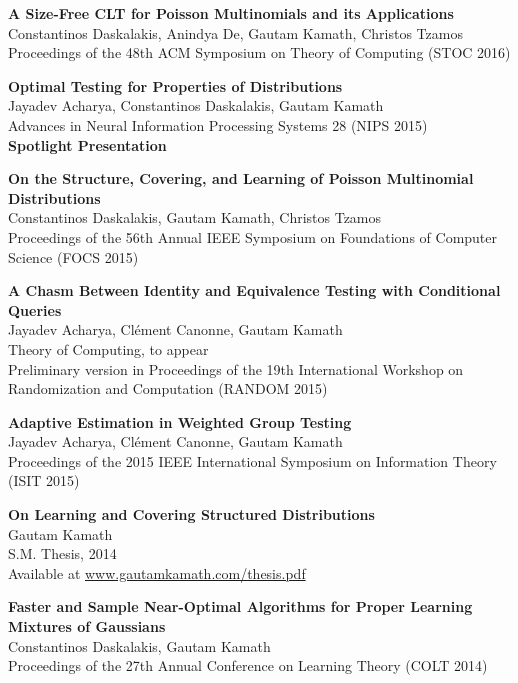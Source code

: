 \documentclass{res}
\begin{document}
\begin{resume}
      {\bf A Size-Free CLT for Poisson Multinomials and its Applications} \\
      Constantinos Daskalakis, Anindya De, Gautam Kamath, Christos Tzamos \\
      Proceedings of the 48th ACM Symposium on Theory of Computing (STOC 2016)
      
      {\bf Optimal Testing for Properties of Distributions} \\
      Jayadev Acharya, Constantinos Daskalakis, Gautam Kamath \\
      Advances in Neural Information Processing Systems 28 (NIPS 2015) \\
      {\bf Spotlight Presentation} 

      {\bf On the Structure, Covering, and Learning of Poisson Multinomial Distributions} \\
      Constantinos Daskalakis, Gautam Kamath, Christos Tzamos \\
      Proceedings of the 56th Annual IEEE Symposium on Foundations of Computer Science (FOCS 2015)

      {\bf A Chasm Between Identity and Equivalence Testing with Conditional Queries} \\
      Jayadev Acharya, Cl\'ement Canonne, Gautam Kamath \\ 
      Theory of Computing, to appear \\
      Preliminary version in Proceedings of the 19th International Workshop on Randomization and Computation (RANDOM 2015)

      {\bf Adaptive Estimation in Weighted Group Testing} \\
      Jayadev Acharya, Cl\'ement Canonne, Gautam Kamath \\ 
      Proceedings of the 2015 IEEE International Symposium on Information Theory (ISIT 2015)
 
      {\bf On Learning and Covering Structured Distributions} \\
      Gautam Kamath \\
      S.M. Thesis, 2014 \\
      Available at \url{www.gautamkamath.com/thesis.pdf} 
     
      {\bf Faster and Sample Near-Optimal Algorithms for Proper Learning Mixtures of Gaussians} \\
      Constantinos Daskalakis, Gautam Kamath \\
      Proceedings of the 27th Annual Conference on Learning Theory (COLT 2014)


\end{resume}
\end{document}
